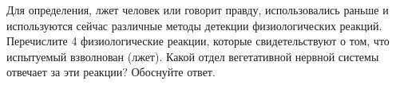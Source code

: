
Для определения, лжет человек или говорит правду, использовались раньше и используются сейчас различные методы детекции физиологических реакций. Перечислите 4 физиологические реакции, которые свидетельствуют о том, что испытуемый взволнован (лжет). Какой отдел вегетативной нервной системы отвечает за эти реакции? Обоснуйте ответ.
